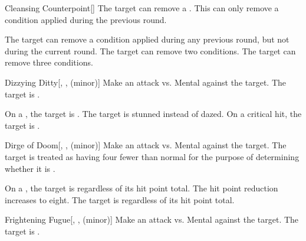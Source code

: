 {            \begin{freeability}{Cleansing Counterpoint}[]
                The target can remove a .
                This can only remove a condition applied during the previous round.

                \rankline
                 The target can remove a condition applied during any previous round, but not during the current round.
                 The target can remove two conditions.
                 The target can remove three conditions.
            \end{freeability}

            \begin{freeability}{Dizzying Ditty}[, ,  (minor)]
                Make an attack vs. Mental against the target.
                \hit The target is .

                \rankline
                 On a , the target is .
                 The target is stunned instead of dazed.
                 On a critical hit, the target is .
            \end{freeability}

            \begin{freeability}{Dirge of Doom}[, ,  (minor)]
                Make an attack vs. Mental against the target.
                \hit The target is treated as having four fewer  than normal for the purpose of determining whether it is .

                \rankline
                 On a , the target is  regardless of its hit point total.
                 The hit point reduction increases to eight.
                 The target is  regardless of its hit point total.
            \end{freeability}

            \begin{freeability}{Frightening Fugue}[, ,  (minor)]
                Make an attack vs. Mental against the target.
                \hit The target is .


\end{freeability}}
